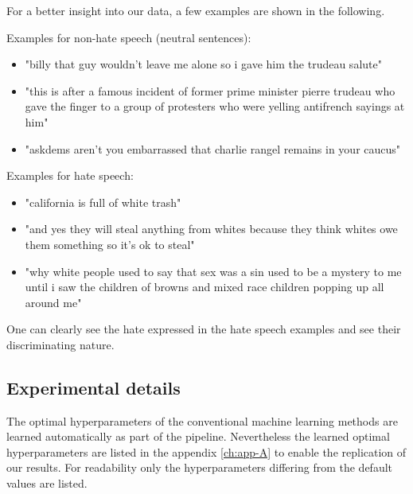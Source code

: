 For a better insight into our data, a few examples are shown in the following.

\noindent
Examples for non-hate speech (neutral sentences):
\begin{itemize}
    \item "billy that guy wouldn't leave me alone so i gave him the trudeau salute"
    \item "this is after a famous incident of former prime minister pierre trudeau who gave the finger to a group of protesters who were yelling antifrench sayings at him"
    \item "askdems aren't you embarrassed that charlie rangel remains in your caucus"
\end{itemize}

\noindent
Examples for hate speech:
\begin{itemize}
    \item "california is full of white trash"
    \item "and yes they will steal anything from whites because they think whites owe them something so it's ok to steal"
    \item "why white people used to say that sex was a sin used to be a mystery to me until i saw the children of browns and mixed race children popping up all around me"
\end{itemize}

One can clearly see the hate expressed in the hate speech examples and see their discriminating nature.

\subsection{Experimental details}

The optimal hyperparameters of the conventional machine learning methods are learned automatically as part of the pipeline. Nevertheless the learned optimal hyperparameters are listed in the appendix \ref{ch:app-A} to enable the replication of our results. For readability only the hyperparameters differing from the default values are listed.
